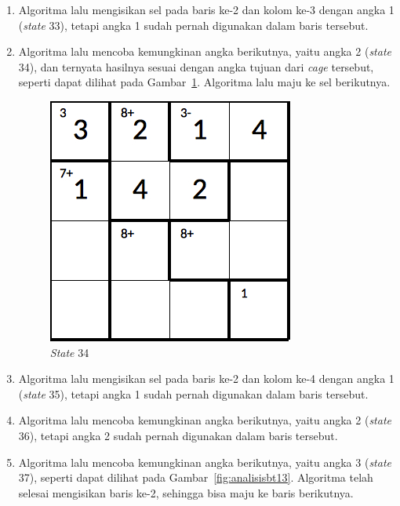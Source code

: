 \begin{enumerate}
\item Algoritma lalu mengisikan sel pada baris ke-2 dan kolom ke-3 dengan angka 1 (\textit{state} 33), tetapi angka 1 sudah pernah digunakan dalam baris tersebut.
\item Algoritma lalu mencoba kemungkinan angka berikutnya, yaitu angka 2 (\textit{state} 34), dan ternyata hasilnya sesuai dengan angka tujuan dari \textit{cage} tersebut, seperti dapat dilihat pada Gambar~\ref{fig:analisisbt12}. Algoritma lalu maju ke sel berikutnya.

\begin{figure}
\centering
\captionsetup{justification=centering}
\includegraphics[scale=0.333]{Gambar/backtracking/State34}
\caption[\textit{State} 34]{\textit{State} 34}
\label{fig:analisisbt12}
\end{figure}

\item Algoritma lalu mengisikan sel pada baris ke-2 dan kolom ke-4 dengan angka 1 (\textit{state} 35), tetapi angka 1 sudah pernah digunakan dalam baris tersebut.
\item Algoritma lalu mencoba kemungkinan angka berikutnya, yaitu angka 2 (\textit{state} 36), tetapi angka 2 sudah pernah digunakan dalam baris tersebut.
\item Algoritma lalu mencoba kemungkinan angka berikutnya, yaitu angka 3 (\textit{state} 37), seperti dapat dilihat pada Gambar~\ref{fig:analisisbt13}. Algoritma telah selesai mengisikan baris ke-2, sehingga bisa maju ke baris berikutnya.


\end{enumerate}
